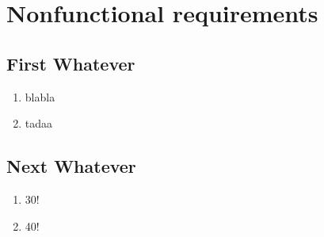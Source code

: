 \section{Nonfunctional requirements}

\renewcommand{\theenumi}{/NF\arabic{enumi}0/}
\renewcommand{\labelenumi}{\theenumi}


\subsection{First Whatever}

\begin{enumerate}
  \item blabla %
  \item tadaa %
\end{enumerate}

\subsection{Next Whatever}

\begin{enumerate}[resume] %
  \item 30!
  \item 40!
\end{enumerate}